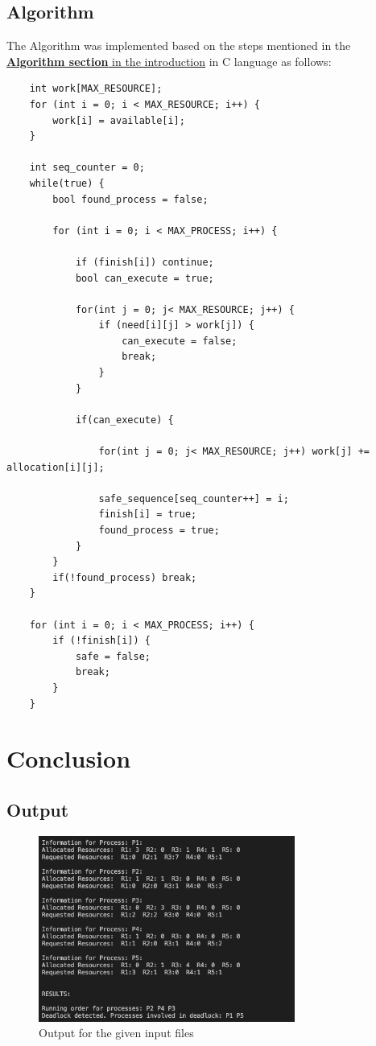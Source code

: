 \documentclass[pdftex,12pt,a4paper]{article}
\begin{document}
\subsection{Algorithm}
The Algorithm was implemented based on the steps mentioned in the \hyperref[algorithm]{\textbf{Algorithm section} in the introduction} in C language as follows:
\begin{lstlisting}
    int work[MAX_RESOURCE];
    for (int i = 0; i < MAX_RESOURCE; i++) {
        work[i] = available[i];
    }

    int seq_counter = 0;
    while(true) {
        bool found_process = false;

        for (int i = 0; i < MAX_PROCESS; i++) {

            if (finish[i]) continue;
            bool can_execute = true;

            for(int j = 0; j< MAX_RESOURCE; j++) {
                if (need[i][j] > work[j]) {
                    can_execute = false;
                    break;
                }
            }

            if(can_execute) {

                for(int j = 0; j< MAX_RESOURCE; j++) work[j] += allocation[i][j];

                safe_sequence[seq_counter++] = i;
                finish[i] = true;
                found_process = true;
            }
        }
        if(!found_process) break;
    }

    for (int i = 0; i < MAX_PROCESS; i++) {
        if (!finish[i]) {
            safe = false;
            break;
        }
    }
\end{lstlisting}

\section{Conclusion}
\subsection{Output}
\begin{figure}[H]
    \centering
    \includegraphics[width=0.75\textwidth]{output.png}
    \caption{Output for the given input files}
    \label{fig:output}
\end{figure}
\end{document}
